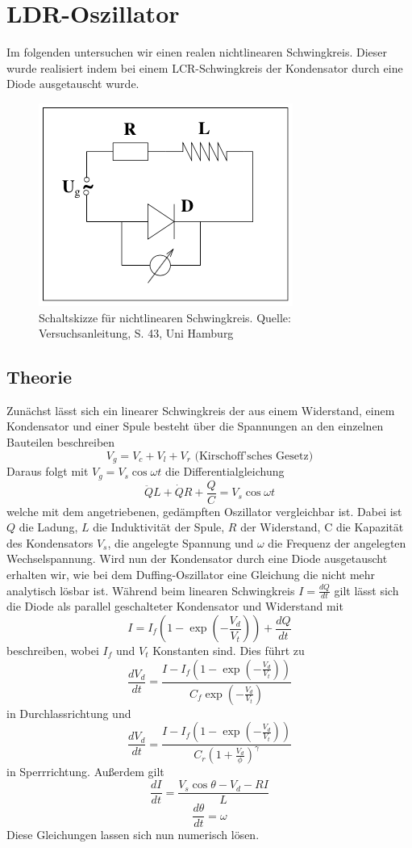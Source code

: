 \documentclass{scrartcl}
\begin{document}
\section {LDR-Oszillator}
Im folgenden untersuchen wir einen realen nichtlinearen Schwingkreis. Dieser wurde realisiert indem bei einem LCR-Schwingkreis der Kondensator durch eine Diode ausgetauscht wurde.
\begin{figure}
	\centering
	\includegraphics[scale=0.60]{schaltskizze}
	\caption{Schaltskizze für nichtlinearen Schwingkreis. Quelle: Versuchsanleitung, S. 43, Uni Hamburg}
	\label{img:schaltskizze}
\end{figure}

\subsection { Theorie } \label{ssec:theo}
Zunächst lässt sich ein linearer Schwingkreis der aus einem Widerstand, einem Kondensator und einer Spule besteht über die Spannungen an den einzelnen Bauteilen beschreiben
$$V_g=V_c+V_l+V_r \text{ (Kirschoff'sches Gesetz)}$$
Daraus folgt mit $V_g=V_s\cos{\omega t}$ die Differentialgleichung
$$\ddot{Q}L + \dot{Q}R+ \frac{Q}{C} = V_s\cos{\omega t}$$
welche mit dem angetriebenen, gedämpften Oszillator vergleichbar ist. Dabei ist $Q$ die Ladung, $L$ die Induktivität der Spule, $R$ der Widerstand, C die Kapazität des Kondensators $V_s$, die angelegte Spannung und $\omega$ die Frequenz der angelegten Wechselspannung.
\newline
Wird nun der Kondensator durch eine Diode ausgetauscht erhalten wir, wie bei dem Duffing-Oszillator eine Gleichung die nicht mehr analytisch lösbar ist. Während beim linearen Schwingkreis $I=\frac{dQ}{dt}$ gilt lässt sich die Diode als parallel geschalteter Kondensator und Widerstand mit 
$$I=I_f(1-\exp(-\frac{V_d}{V_t})) + \frac{dQ}{dt}$$
beschreiben, wobei $I_f$ und $V_t$ Konstanten sind.
Dies führt zu
$$\frac{dV_d}{dt}= \frac{I-I_f(1-\exp(-\frac{V_d}{V_t}))}{C_f\exp(-\frac{V_d}{V_t})} $$
in Durchlassrichtung und 
$$\frac{dV_d}{dt}= \frac{I-I_f(1-\exp(-\frac{V_d}{V_t}))}{C_r(1+\frac{V_d}{\phi})^{\gamma}}$$
in Sperrrichtung.
Außerdem gilt
$$\frac{dI}{dt}=\frac{V_s \cos{\theta} - V_d - RI}{L}$$
$$\frac{d\theta}{dt}=\omega$$
Diese Gleichungen lassen sich nun numerisch lösen.
\end{document}
